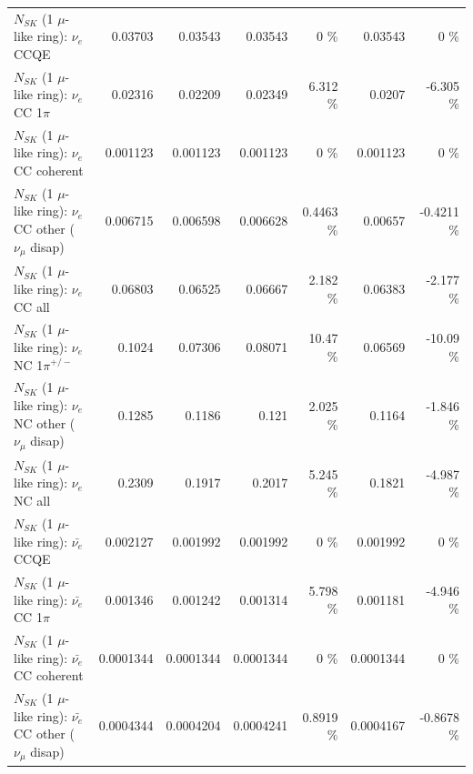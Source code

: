 \begin{table}
\begin{tabular}{| l | r | r | r  r | r  r |}
\hline
\hline
\hline
                                      $N_{SK}$ (1 $\mu$-like ring): $\nu_e$ CCQE &         0.03703 &         0.03543 &         0.03543 &        0 \%  &         0.03543 &        0 \%  \\ 
                                 $N_{SK}$ (1 $\mu$-like ring): $\nu_e$ CC 1$\pi$ &         0.02316 &         0.02209 &         0.02349 &    6.312 \%  &          0.0207 &   -6.305 \%  \\ 
                               $N_{SK}$ (1 $\mu$-like ring): $\nu_e$ CC coherent &        0.001123 &        0.001123 &        0.001123 &        0 \%  &        0.001123 &        0 \%  \\ 
                $N_{SK}$ (1 $\mu$-like ring): $\nu_e$ CC other ($\nu_\mu$ disap) &        0.006715 &        0.006598 &        0.006628 &   0.4463 \%  &         0.00657 &  -0.4211 \%  \\ 
                                  $N_{SK}$ (1 $\mu$-like ring): $\nu_{e}$ CC all &         0.06803 &         0.06525 &         0.06667 &    2.182 \%  &         0.06383 &   -2.177 \%  \\ 
\hline
                           $N_{SK}$ (1 $\mu$-like ring): $\nu_e$ NC 1$\pi^{+/-}$ &          0.1024 &         0.07306 &         0.08071 &    10.47 \%  &         0.06569 &   -10.09 \%  \\ 
                $N_{SK}$ (1 $\mu$-like ring): $\nu_e$ NC other ($\nu_\mu$ disap) &          0.1285 &          0.1186 &           0.121 &    2.025 \%  &          0.1164 &   -1.846 \%  \\ 
                                  $N_{SK}$ (1 $\mu$-like ring): $\nu_{e}$ NC all &          0.2309 &          0.1917 &          0.2017 &    5.245 \%  &          0.1821 &   -4.987 \%  \\ 
\hline
\hline
\hline
                                $N_{SK}$ (1 $\mu$-like ring): $\bar{\nu_e}$ CCQE &        0.002127 &        0.001992 &        0.001992 &        0 \%  &        0.001992 &        0 \%  \\ 
                           $N_{SK}$ (1 $\mu$-like ring): $\bar{\nu_e}$ CC 1$\pi$ &        0.001346 &        0.001242 &        0.001314 &    5.798 \%  &        0.001181 &   -4.946 \%  \\ 
                         $N_{SK}$ (1 $\mu$-like ring): $\bar{\nu_e}$ CC coherent &       0.0001344 &       0.0001344 &       0.0001344 &        0 \%  &       0.0001344 &        0 \%  \\ 
          $N_{SK}$ (1 $\mu$-like ring): $\bar{\nu_e}$ CC other ($\nu_\mu$ disap) &       0.0004344 &       0.0004204 &       0.0004241 &   0.8919 \%  &       0.0004167 &  -0.8678 \%  \\ 

\end{tabular}
\end{table}
